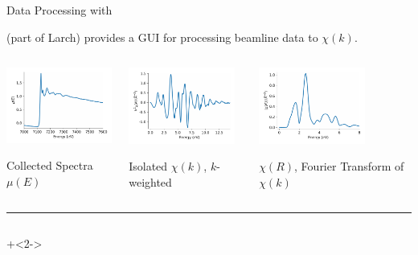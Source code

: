\begin{slide}{Data Processing with {\xasviewer}  }

  \begin{cenpage}{135mm}
  {\xasviewer} (part of Larch) provides a GUI for
  processing beamline data to $\chi(k)$.

  \begin{columns}
    \begin{column}{45mm}
      
      \includegraphics[width=35mm]{figs/experiment/feo_mu}

      \vmm
      Collected Spectra $\mu(E)$
      
    \end{column}
    \begin{column}{45mm}
      \includegraphics[width=35mm]{figs/experiment/feo_chik}

      \vmm
      Isolated $\chi(k)$, $k$-weighted 
      
    \end{column}
    \begin{column}{45mm}
      \includegraphics[width=35mm]{figs/experiment/feo_chir} 

      \vmm
      $\chi(R)$, Fourier Transform of $\chi(k)$ 
      
    \end{column}
  \end{columns}

  \vmm \hrule

  \vmm\vmm

{\small{
  \begin{columns}[T]
    \begin{column}{65mm}
      \onslide+<2->


\end{column}
\end{columns}}}
\end{cenpage}
\end{slide}
